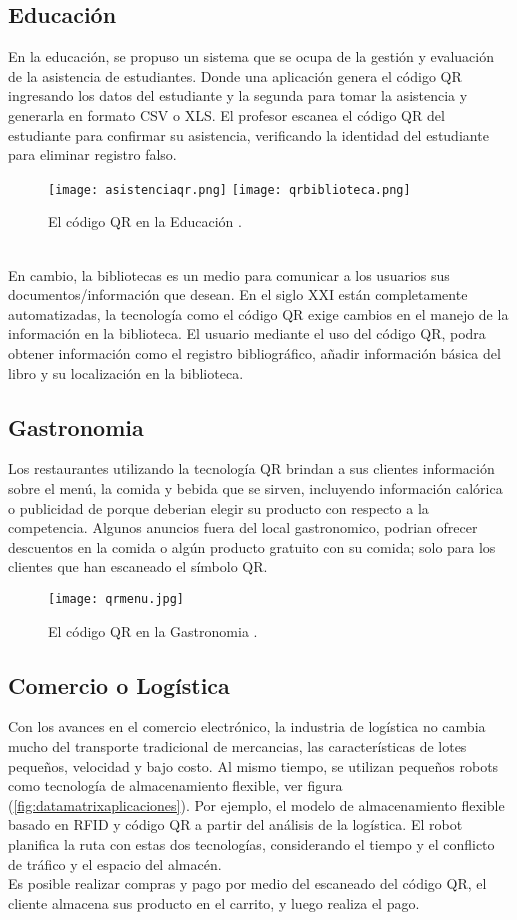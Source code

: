 \subsection{Educación}
En la educación, se propuso un sistema que se ocupa de la gestión y evaluación de la asistencia de estudiantes. Donde una aplicación genera el código QR ingresando los datos del estudiante y la segunda para tomar la asistencia y generarla en formato CSV o XLS. El profesor escanea el código QR del estudiante para confirmar su asistencia, verificando la identidad del estudiante para eliminar registro falso. \cite{2017_Wei}
\begin{figure} 	
	\centering
	\texttt{[image: asistenciaqr.png]}
	\texttt{[image: qrbiblioteca.png]}
	\caption{El código QR en la Educación .}
	\label{fig:qreducacion}
\end{figure}
\\
En cambio, la bibliotecas es un medio para comunicar a los usuarios sus documentos/información que desean. En el siglo XXI están completamente automatizadas, la tecnología como el código QR exige cambios en el manejo de la información en la biblioteca. El usuario mediante el uso del código QR, podra obtener información como el registro bibliográfico, añadir información básica del libro y su localización en la biblioteca.\cite{2017_Parabhoi}

\subsection{Gastronomia}
Los restaurantes utilizando la tecnología QR brindan a sus clientes información sobre el menú, la comida y bebida que se sirven, incluyendo información calórica o publicidad de porque deberian elegir su producto con respecto a la competencia. Algunos anuncios fuera del local gastronomico, podrian ofrecer descuentos en la comida o algún producto gratuito con su comida; solo para los clientes que han escaneado el símbolo QR.\cite{2012_Emek}
\begin{figure} 	
	\centering
	\texttt{[image: qrmenu.jpg]}
	\caption{El código QR en la Gastronomia .}
	\label{fig:qrmenu}
\end{figure}

\subsection{Comercio o Logística}
Con los avances en el comercio electrónico, la industria de logística no cambia mucho del transporte tradicional de mercancias, las características de lotes pequeños, velocidad y bajo costo. Al mismo tiempo, se utilizan pequeños robots como tecnología de almacenamiento flexible, ver figura (\ref{fig:datamatrixaplicaciones}). Por ejemplo, el modelo de almacenamiento flexible basado en RFID y código QR a partir del análisis de la logística. El robot planifica la ruta con estas dos tecnologías, considerando el tiempo y el conflicto de tráfico y el espacio del almacén.\cite{XiaoLong2017}
\\
Es posible realizar compras y pago por medio del escaneado del código QR, el cliente almacena sus producto en el carrito, y luego realiza el pago. \cite{2018_Banu}

